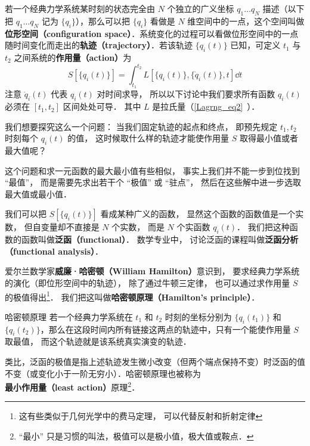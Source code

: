 

若一个经典力学系统某时刻的状态完全由 $N$ 个独立的广义坐标 $q_1\dots q_N$ 描述（以下把 $q_1\dots q_N$ 记为 $\{q_i\}$），那么可以把 $\{q_i\}$ 看做是 $N$ 维空间中的一点，这个空间叫做\textbf{位形空间（configuration space）}．系统变化的过程可以看做位形空间中的一点随时间变化而走出的\textbf{轨迹（trajectory）}．若该轨迹 $\{ {{q_i}(t)} \}$ 已知，可定义 $t_1$ 与 $t_2$ 之间系统的\textbf{作用量（action）}为
\begin{equation}\label{HamPrn_eq1}
S[\{q_i(t)\}] = \int_{t_1}^{t_2} L[\{q_i(t)\}, \{\dot q_i(t)\}, t] \dd{t}
\end{equation}
注意 $\dot q_i(t)$ 代表 $q_i(t)$ 对时间求导， 所以以下讨论中我们要求所有函数 $q_i(t)$ 必须在 $[t_1, t_2]$ 区间处处可导． 其中 $L$ 是拉氏量（\autoref{Lagrng_eq2}~）．

我们想要探究这么一个问题： 当我们固定轨迹的起点和终点， 即预先规定 $t_1, t_2$ 时刻每个 $q_i(t)$ 的值， 这时候取什么样的轨迹才能使作用量 $S$ 取得最小值或者最大值呢？

这个问题和求一元函数的最大最小值有些相似， 事实上我们并不能一步到位找到 “最值”， 而是需要先求出若干个 “极值” 或 “驻点”， 然后在这些解中进一步选取最大值或最小值．

我们可以把 $S[\{q_i(t)\}]$ 看成某种广义的函数， 显然这个函数的函数值是一个实数， 但自变量却不直接是 $N$ 个实数， 而是 $N$ 个实函数 $q_i(t)$． 我们把这种函数的函数叫做\textbf{泛函（functional）}．%
数学专业中， 讨论泛函的课程叫做\textbf{泛函分析（functional analysis）}．

爱尔兰数学家\textbf{威廉·哈密顿（William Hamilton）}意识到， 要求经典力学系统的演化（即位形空间中的轨迹）， 除了通过牛顿三定律， 也可以通过求作用量 $S$ 的极值得出\footnote{这有些类似于几何光学中的费马定理， 可以代替反射和折射定律}． 我们把这叫做\textbf{哈密顿原理（Hamilton's principle）}．

\begin{theorem}{哈密顿原理}
若一个经典力学系统在 $t_1$ 和 $t_2$ 时刻的坐标分别为 $\{q_i(t_1)\}$ 和 $\{q_i(t_2)\}$，那么在这段时间内所有链接这两点的轨迹中，只有一个能使作用量 $S$ 取最值， 而这个轨迹就是该系统真实演变的轨迹．
\end{theorem}

类比，泛函的极值是指上述轨迹发生微小改变（但两个端点保持不变）时泛函的值不变（或变化小于一阶无穷小）．哈密顿原理也被称为\textbf{最小作用量（least action）}原理\footnote{“最小” 只是习惯的叫法，极值可以是极小值，极大值或鞍点．}．%

